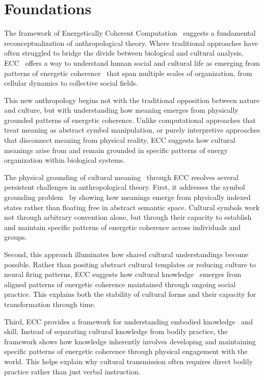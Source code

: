 \section{Foundations}

The framework of Energetically Coherent Computation~ suggests a fundamental reconceptualization of anthropological theory. Where traditional approaches have often struggled to bridge the divide between biological and cultural analysis, ECC~ offers a way to understand human social and cultural life as emerging from patterns of energetic coherence~ that span multiple scales of organization, from cellular dynamics to collective social fields.

This new anthropology begins not with the traditional opposition between nature and culture, but with understanding how meaning emerges from physically grounded patterns of energetic coherence. Unlike computational approaches that treat meaning as abstract symbol manipulation, or purely interpretive approaches that disconnect meaning from physical reality, ECC suggests how cultural meanings arise from and remain grounded in specific patterns of energy organization within biological systems.

The physical grounding of cultural meaning~ through ECC resolves several persistent challenges in anthropological theory. First, it addresses the symbol grounding problem~ by showing how meanings emerge from physically indexed states rather than floating free in abstract semantic space. Cultural symbols work not through arbitrary convention alone, but through their capacity to establish and maintain specific patterns of energetic coherence across individuals and groups.

Second, this approach illuminates how shared cultural understandings become possible. Rather than positing abstract cultural templates or reducing culture to neural firing patterns, ECC suggests how cultural knowledge~ emerges from aligned patterns of energetic coherence maintained through ongoing social practice. This explains both the stability of cultural forms and their capacity for transformation through time.

Third, ECC provides a framework for understanding embodied knowledge~ and skill. Instead of separating cultural knowledge from bodily practice, the framework shows how knowledge inherently involves developing and maintaining specific patterns of energetic coherence through physical engagement with the world. This helps explain why cultural transmission often requires direct bodily practice rather than just verbal instruction.

